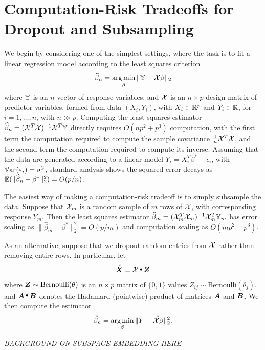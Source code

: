 \section{Computation-Risk Tradeoffs for Dropout and Subsampling}
\label{sec:subsampling}

We begin by considering one of the simplest settings, where
the task is to fit a linear regression model according to the least squares
criterion
\begin{equation}
\widehat \beta_n = \mathop{\text{\rm arg\,min}}_\beta \|\mathbb{Y} - \mathcal{X}\beta\|_2
\end{equation}
where $\mathbb{Y}$ is an $n$-vector of response variables, and $\mathcal{X}$ is an
$n\times p$ design matrix of predictor variables, formed from data
$(X_i, Y_i)$, with $X_i\in{\mathbb R}^p$ and $Y_i\in{\mathbb R}$, for
$i=1,\ldots, n$, with $n\gg p$.  Computing the least squares
estimator $\widehat\beta_n = (\mathcal{X}^T \mathcal{X})^{-1} \mathcal{X}^T \mathbb{Y}$ directly requires
$O(np^2 + p^3)$ computation, with the first term the computation
required to compute the sample covariance $\frac{1}{n} \mathcal{X}^T \mathcal{X}$,
and the second term the computation required to compute its inverse.
Assuming that the data are generated according to a linear model
$Y_i = X_i^T \beta^* + \epsilon_i$, with $\mathop{\mathbb{V}\textrm{ar}}\kern.1ex(\varepsilon_i) =
\sigma^2$, standard analysis shows the squared error decays as
${\mathbb E}(\|\widehat\beta_n - \beta^*\|_2^2) = O(p/n)$.

The easiest way of making a computation-risk tradeoff is to simply 
subsample the data.  Suppose that $\mathcal{X}_m$ is a random sample
of $m$ rows of $\mathcal{X}$, with corresponding response $Y_m$.
Then the least squares estimator $\widehat \beta_m =
(\mathcal{X}_m^T \mathcal{X}_m)^{-1} \mathcal{X}_m^T \mathbb{Y}_m$ 
has error scaling as $\|\hat\beta_m - \beta^*\|_2^2 = O(p/m)$
and computation scaling as $O(m p^2 + p^3)$.  

As an alternative, suppose that we dropout random entries from $\mathcal{X}$
rather than removing entire rows.  In particular, let
\begin{equation}
\Xdrop = \X \hadamard \bZ
\end{equation}
where $\mbox{\boldmath$Z$} \sim \text{Bernoulli}(\theta)$ is an $n\times p$ matrix of
$\{0,1\}$ values $Z_{ij} \sim \text{Bernoulli}(\theta_j)$, and 
$\mbf{A}\hadamard \mbf{B}$ denotes the Hadamard (pointwise) product
of matrices $\mbox{\boldmath$A$}$ and $\mbox{\boldmath$B$}$.  We then compute the
estimator
\begin{equation}
\accentset{\;\circ}{\beta}_n = \mathop{\text{\rm arg\,min}}_\beta \|Y - \accentset{\;\circ}{\mathcal{X}} \beta\|_2 ^2.
\end{equation}

\vskip10pt
\centerline{\textit{\small BACKGROUND ON SUBSPACE EMBEDDING HERE}}
\vskip10pt

